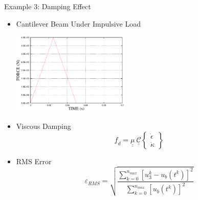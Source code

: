 \documentclass[dvips,xcolor=cmyk]{beamer}
\newcommand{\tens}[1]{\underline{\underline{#1}}}
\renewcommand{\vec}[1]{\underline{#1}}
\begin{document}
\begin{frame}{Example 3: Damping Effect}
\begin{itemize}
    \item Cantilever Beam Under Impulsive Load
    \begin{center}
     \includegraphics[width=2.2in]{EPSF/AM2_Excitation.eps}
     \end{center}  
     
     \pause
     \item Viscous Damping
     \begin{equation*}
   \label{Damping}
   \vec{f}_d = \tens{\mu}~ \tens{\mathcal{C}} \begin{Bmatrix}
   \dot{\epsilon} \\
   \dot{\kappa}
   \end{Bmatrix}
\end{equation*}

   \item RMS Error
   \begin{equation*}
\varepsilon_{RMS}=\sqrt{\frac{\sum_{k=0}^{n_{max}}[u_3^k-u_b(t^k)]^2}{\sum_{k=0}^{n_{max}}[u_b(t^k)]^2}}
\label{RMSdefi}
\end{equation*}
\end{itemize}
\end{frame}
\end{document}
